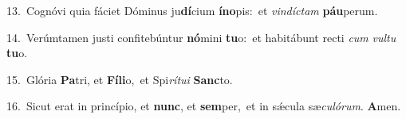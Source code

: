 {\numbfont\textcolor{\numbcolor}{13.}}~Cognóvi quia fáciet Dóminus ju\-\textbf{dí}\-cium \textbf{ín}\-\textbf{o}pis:~\star et \textit{vin}\-\textit{díc}\textit{tam} \textbf{páu}\-perum.\par
{\numbfont\textcolor{\numbcolor}{14.}}~Verúmtamen justi confitebúntur \textbf{nó}\-mini \textbf{tu}\-o:~\star et habitábunt recti \textit{cum} \textit{vul}\-\textit{tu} \textbf{tu}\-o.\par
{\numbfont\textcolor{\numbcolor}{15.}}~Glória \textbf{Pa}\-tri, et \textbf{Fí}\-\textbf{li}o,~\star et Spi\-\textit{rí}\-\textit{tu}\textit{i} \textbf{Sanc}\-to.\par
{\numbfont\textcolor{\numbcolor}{16.}}~Sicut erat in princípio, et \textbf{nunc}\-, et \textbf{sem}\-per,~\star et in sǽcula sæ\-\textit{cu}\-\textit{ló}\textit{rum}. \textbf{A}\-men.\par
